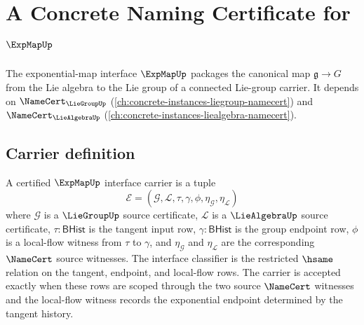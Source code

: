 \chapter{A Concrete Naming Certificate for $\ExpMapUp$}
\label{ch:concrete-instances-expmap-namecert}

The exponential-map interface $\ExpMapUp$ packages the canonical map $\mathfrak{g} \to G$ from the Lie algebra to the Lie group of a connected Lie-group carrier. It depends on $\NameCert_{\LieGroupUp}$ (\autoref{ch:concrete-instances-liegroup-namecert}) and $\NameCert_{\LieAlgebraUp}$ (\autoref{ch:concrete-instances-liealgebra-namecert}).

\section{Carrier definition}
\label{sec:expmap-carrier}

\begin{definition}
\label{def:expmap-certified-interface-carrier}
A certified $\ExpMapUp$ interface carrier is a tuple
$$
\mathcal{E}=(\mathcal{G},\mathcal{L},\tau,\gamma,\phi,\eta_{\mathcal{G}},\eta_{\mathcal{L}})
$$
where $\mathcal{G}$ is a $\LieGroupUp$ source certificate, $\mathcal{L}$ is a $\LieAlgebraUp$ source certificate, $\tau:\mathsf{BHist}$ is the tangent input row, $\gamma:\mathsf{BHist}$ is the group endpoint row, $\phi$ is a local-flow witness from $\tau$ to $\gamma$, and $\eta_{\mathcal{G}}$ and $\eta_{\mathcal{L}}$ are the corresponding $\NameCert$ source witnesses. The interface classifier is the restricted $\hsame$ relation on the tangent, endpoint, and local-flow rows. The carrier is accepted exactly when these rows are scoped through the two source $\NameCert$ witnesses and the local-flow witness records the exponential endpoint determined by the tangent history.
\end{definition}

